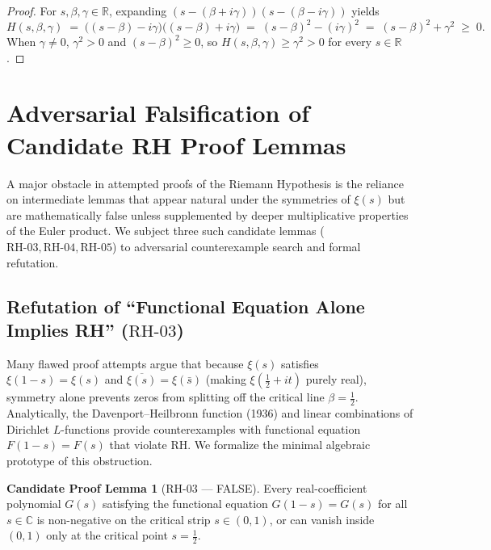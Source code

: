 \documentclass[11pt,a4paper]{article}
\theoremstyle{plain}
\theoremstyle{definition}
\newtheorem{candidate}[theorem]{Candidate Proof Lemma}
\theoremstyle{remark}
\newcommand{\C}{\mathbb{C}}
\newcommand{\R}{\mathbb{R}}
\begin{document}
\begin{proof}
For $s, \beta, \gamma \in \R$, expanding $(s - (\beta + i\gamma))(s - (\beta - i\gamma))$ yields
\[
  H(s, \beta, \gamma) \;=\; \bigl((s - \beta) - i\gamma\bigr)\bigl((s - \beta) + i\gamma\bigr) \;=\; (s - \beta)^2 - (i\gamma)^2 \;=\; (s - \beta)^2 + \gamma^2 \;\ge\; 0.
\]
When $\gamma \ne 0$, $\gamma^2 > 0$ and $(s - \beta)^2 \ge 0$, so $H(s, \beta, \gamma) \ge \gamma^2 > 0$ for every $s \in \R$.
\end{proof}

\section{Adversarial Falsification of Candidate RH Proof Lemmas}

A major obstacle in attempted proofs of the Riemann Hypothesis is the reliance on intermediate lemmas that appear natural under the symmetries of $\xi(s)$ but are mathematically false unless supplemented by deeper multiplicative properties of the Euler product. We subject three such candidate lemmas ($\mathrm{RH\text{-}03}, \mathrm{RH\text{-}04}, \mathrm{RH\text{-}05}$) to adversarial counterexample search and formal refutation.

\subsection{Refutation of ``Functional Equation Alone Implies RH'' (\texorpdfstring{$\mathrm{RH\text{-}03}$}{RH-03})}

Many flawed proof attempts argue that because $\xi(s)$ satisfies $\xi(1-s) = \xi(s)$ and $\overline{\xi(s)} = \xi(\bar{s})$ (making $\xi(\frac{1}{2} + it)$ purely real), symmetry alone prevents zeros from splitting off the critical line $\beta = \frac{1}{2}$. Analytically, the Davenport--Heilbronn function (1936) and linear combinations of Dirichlet $L$-functions provide counterexamples with functional equation $F(1-s)=F(s)$ that violate RH. We formalize the minimal algebraic prototype of this obstruction.

\begin{candidate}[$\mathrm{RH\text{-}03}$ --- FALSE]\label{cand:rh03}
Every real-coefficient polynomial $G(s)$ satisfying the functional equation $G(1 - s) = G(s)$ for all $s \in \C$ is non-negative on the critical strip $s \in (0, 1)$, or can vanish inside $(0, 1)$ only at the critical point $s = \frac{1}{2}$.
\end{candidate}
\end{document}
